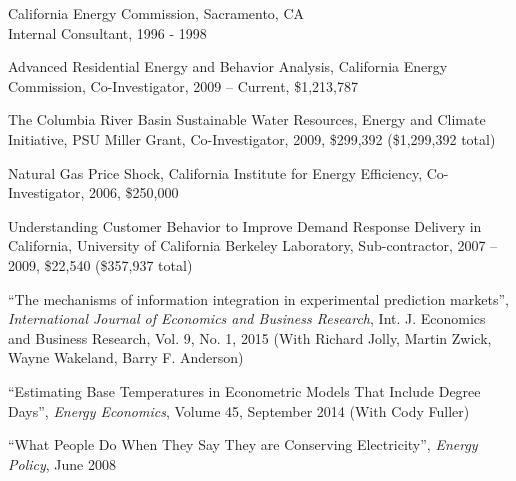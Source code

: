 \documentclass[Computer Science]{vita}
\begin{document}
\begin{vita}
\begin{Experience}
  \item California Energy Commission, Sacramento, CA\\
    Internal Consultant, 1996 - 1998
	  \end{Experience}

 \begin{Selected Grants and Sponsored Research}

\item Advanced Residential Energy and Behavior Analysis, California Energy Commission, Co-Investigator, 2009 -- Current, \$1,213,787

\item The Columbia River Basin Sustainable Water Resources, Energy and Climate Initiative,  PSU Miller Grant, Co-Investigator, 2009, \$299,392 (\$1,299,392 total)

  \item Natural Gas Price Shock, California Institute for Energy
    Efficiency, Co-Investigator, 2006, \$250,000


  \item Understanding Customer Behavior to Improve Demand Response Delivery in California, University of California Berkeley Laboratory, Sub-contractor, 2007 -- 2009, \$22,540 (\$357,937 total)


  \end{Selected Grants and Sponsored Research}

  \begin{Selected Publications}


    \begin{Papers in Refereed Journals}
    
 \item ``The mechanisms of information integration in experimental prediction markets'',  \emph{International Journal of Economics and Business Research}, Int. J. Economics and Business Research, Vol. 9, No. 1, 2015 (With Richard Jolly, Martin Zwick, Wayne Wakeland, Barry F. Anderson)
      
    \item ``Estimating Base Temperatures in Econometric Models That Include Degree Days'',  \emph{Energy Economics}, Volume 45, September 2014 (With Cody Fuller)
    
   
    \item ``What People Do When They Say They are Conserving
      Electricity'', \emph{Energy Policy}, June 2008




\end{Papers in Refereed Journals}
\end{Selected Publications}
\end{vita}
\end{document}
